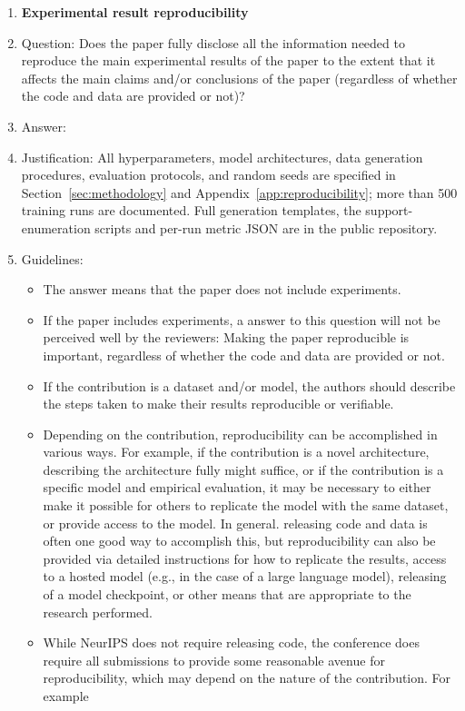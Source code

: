 \documentclass{article}
\begin{document}
\begin{enumerate}
    \item {\bf Experimental result reproducibility}
    \item[] Question: Does the paper fully disclose all the information needed to reproduce the main experimental results of the paper to the extent that it affects the main claims and/or conclusions of the paper (regardless of whether the code and data are provided or not)?
    \item[] Answer: \answerYes{}
    \item[] Justification: All hyperparameters, model architectures, data generation procedures, evaluation protocols, and random seeds are specified in Section~\ref{sec:methodology} and Appendix~\ref{app:reproducibility}; more than 500 training runs are documented. Full generation templates, the support-enumeration scripts and per-run metric JSON are in the public repository.
    \item[] Guidelines:
    \begin{itemize}
        \item The answer \answerNA{} means that the paper does not include experiments.
        \item If the paper includes experiments, a \answerNo{} answer to this question will not be perceived well by the reviewers: Making the paper reproducible is important, regardless of whether the code and data are provided or not.
        \item If the contribution is a dataset and\slash or model, the authors should describe the steps taken to make their results reproducible or verifiable.
        \item Depending on the contribution, reproducibility can be accomplished in various ways. For example, if the contribution is a novel architecture, describing the architecture fully might suffice, or if the contribution is a specific model and empirical evaluation, it may be necessary to either make it possible for others to replicate the model with the same dataset, or provide access to the model. In general. releasing code and data is often one good way to accomplish this, but reproducibility can also be provided via detailed instructions for how to replicate the results, access to a hosted model (e.g., in the case of a large language model), releasing of a model checkpoint, or other means that are appropriate to the research performed.
        \item While NeurIPS does not require releasing code, the conference does require all submissions to provide some reasonable avenue for reproducibility, which may depend on the nature of the contribution. For example

\end{itemize}
\end{enumerate}
\end{document}
